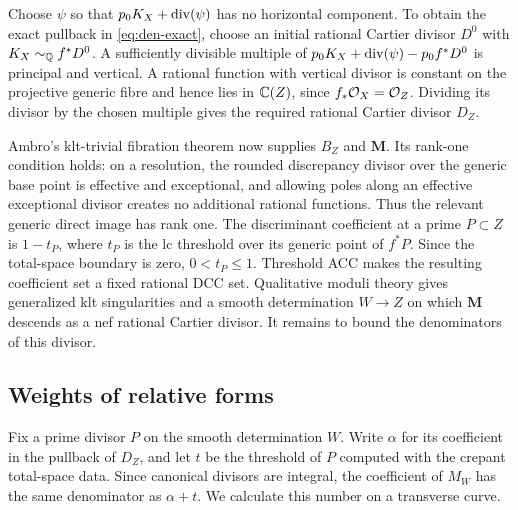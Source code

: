 Choose $\psi$ so that $p_0K_X+\operatorname{div}(\psi)$ has no horizontal
component.  To obtain the exact pullback in \eqref{eq:den-exact},
choose an initial rational Cartier divisor $D^0$ with
$K_X\sim_{\mathbb Q}f^*D^0$.  A sufficiently divisible multiple of
$p_0K_X+\operatorname{div}(\psi)-p_0f^*D^0$ is principal and vertical.  A
rational function with vertical divisor is constant on the projective
generic fibre and hence lies in $\mathbb C(Z)$, since $f_*\mathcal O_X=\mathcal O_Z$.
Dividing its divisor by the chosen multiple gives the required
rational Cartier divisor $D_Z$.

Ambro's klt-trivial fibration theorem \cite{Ambro2005} now supplies
$B_Z$ and $\mathbf M$.  Its rank-one condition holds: on a
resolution, the rounded discrepancy divisor over the generic base
point is effective and exceptional, and allowing poles along an
effective exceptional divisor creates no additional rational
functions.  Thus the relevant generic direct image has rank one.
The discriminant coefficient at a prime $P\subset Z$ is
$1-t_P$, where $t_P$ is the lc threshold over its generic point of
$f^*P$.  Since the total-space boundary is zero, $0<t_P\leq1$.
Threshold ACC \cite{HMX2014} makes the resulting coefficient set a
fixed rational DCC set.  Qualitative moduli theory gives generalized
klt singularities and a smooth determination $W\to Z$ on which
$\mathbf M$ descends as a nef rational Cartier divisor.  It remains
to bound the denominators of this divisor.

\subsection{Weights of relative forms}

Fix a prime divisor $P$ on the smooth determination $W$.  Write
$\alpha$ for its coefficient in the pullback of $D_Z$, and let $t$
be the threshold of $P$ computed with the crepant total-space data.
Since canonical divisors are integral, the coefficient of $M_W$
has the same denominator as $\alpha+t$.  We calculate this number
on a transverse curve.


